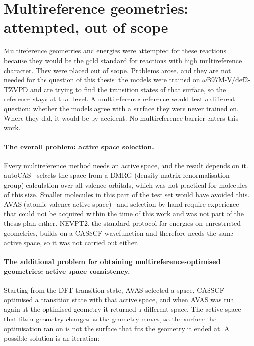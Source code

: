 
\section{Multireference geometries: attempted, out of scope}
\label{sec:mr-whynotmr}

Multireference geometries and energies were attempted for these reactions
because they would be the gold standard for reactions with high
multireference character. They were placed out of scope. Problems arose,
and they are not needed for the question of this thesis: the models were
trained on \mbox{$\omega$B97M-V/def2-TZVPD} and are trying to find the
transition states of that surface, so the reference stays at that level.
A multireference reference
would test a different question: whether the models agree with a
surface they were never trained on. Where they did, it would be by
accident. No multireference barrier enters this work.

\paragraph{The overall problem: active space selection.} Every
multireference method needs an active space, and the result depends on
it. autoCAS~\cite{stein2019autocas} selects the space from a DMRG
(density matrix renormalisation group) calculation over all valence orbitals, which was not practical for
molecules of this size. Smaller molecules in this part of the test set
would have avoided this. AVAS (atomic valence active space)~\cite{sayfutyarova2017} and selection by
hand require experience that could not be acquired within the time of
this work and was not part of the thesis plan either. NEVPT2, the
standard protocol for energies on unrestricted geometries, builds on a
CASSCF wavefunction and therefore needs the same active space, so it
was not carried out either.

\paragraph{The additional problem for obtaining multireference-optimised
geometries: active space consistency.} Starting from the DFT transition state, AVAS selected a
space, CASSCF optimised a transition state with that active space, and
when AVAS was run again at the optimised geometry it returned a
different space. The active space that
fits a geometry changes as the geometry moves, so the surface the
optimisation ran on is not the surface that fits the geometry it ended
at. A possible solution is an iteration:

